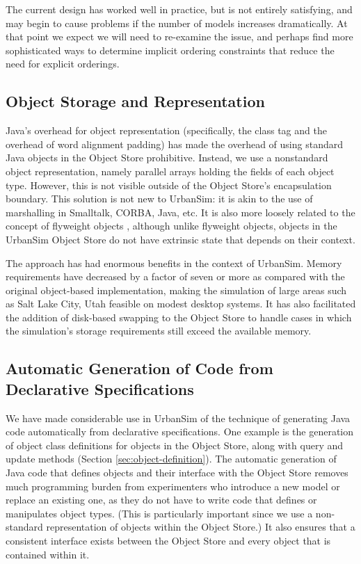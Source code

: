 The current design has worked well in practice, but is not entirely
satisfying, and may begin to cause problems if the number of models
increases dramatically.  At that point we expect we will need to re-examine
the issue, and perhaps find more sophisticated ways to determine implicit
ordering constraints that reduce the need for explicit orderings.

\subsection{Object Storage and Representation}

Java's overhead for object representation (specifically, the class tag and
the overhead of word alignment padding) has made the overhead of using
standard Java objects in the Object Store prohibitive.  Instead, we use a
nonstandard object representation, namely parallel arrays holding the
fields of each object type.  However, this is not visible outside of the
Object Store's encapsulation boundary.
This solution is not new to UrbanSim: it is akin to the use of
marshalling in Smalltalk, CORBA, Java, etc.  It is also more loosely
related to the concept of flyweight objects
\citep{calder-uist-1990,gamma-book-1995}, although unlike flyweight objects,
objects in the UrbanSim Object Store do not have extrinsic state that
depends on their context.

The approach has had enormous benefits in the context of UrbanSim.  Memory
requirements have decreased by a factor of seven or more as compared with
the original object-based implementation, making the simulation of large
areas such as Salt Lake City, Utah feasible on modest desktop systems.  It
has also facilitated the addition of disk-based swapping to the Object
Store to handle cases in which the simulation's storage requirements still
exceed the available memory.

\subsection{Automatic Generation of Code from Declarative Specifications}

We have made considerable use in UrbanSim of the technique of generating
Java code automatically from declarative specifications.  One example is
the generation of object class definitions for objects in the Object Store,
along with query and update methods (Section \ref{sec:object-definition}).
The automatic generation of Java code that defines objects and their
interface with the Object Store removes much programming burden from
experimenters who introduce a new model or replace an existing one, as they
do not have to write code that defines or manipulates object types.  (This
is particularly important since we use a non-standard representation of objects
within the Object Store.)  It also ensures that a consistent interface
exists between the Object Store and every object that is contained within
it.

